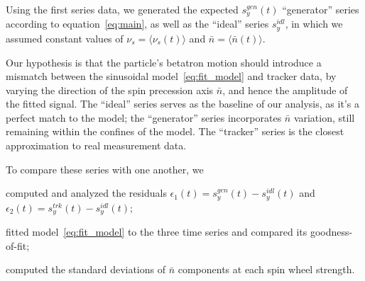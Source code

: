 \documentclass[a4paper]{jacow}
\newcommand{\avg}[1]{\langle {#1} \rangle}
\newcommand{\nbar}{\bar n}
\begin{document}

Using the first series data, we generated the expected $s_y^{gen}(t)$ ``generator'' series according to
equation~\eqref{eq:main}, as well as the ``ideal'' series $s_y^{idl}$, in which
we assumed constant values of $\nu_s = \avg{\nu_s(t)}$ and $\nbar
=\avg{\nbar(t)}$. 

Our hypothesis is that the particle's betatron
motion should introduce a mismatch between the sinusoidal
model~\eqref{eq:fit_model} and tracker data, by varying the direction
of the spin precession axis $\nbar$, and hence the amplitude of the
fitted signal. The ``ideal'' series serves as the baseline of our
analysis, as it's a perfect match to the model; the ``generator''
series incorporates $\nbar$ variation, still remaining within the confines of
the model. The ``tracker'' series is the closest approximation to
real measurement data.

To compare these series with one another, we
\begin{inparaenum}
\item computed and analyzed the residuals $\epsilon_1(t) = s_y^{gen}(t) -
s_y^{idl}(t)$ and $\epsilon_2(t) = s_y^{trk}(t) - s_y^{idl}(t)$;
\item fitted model~\eqref{eq:fit_model} to the three time series and
  compared its goodness-of-fit;
\item computed the standard deviations of $\nbar$ components at each
  spin wheel strength.
\end{inparaenum}
\end{document}

